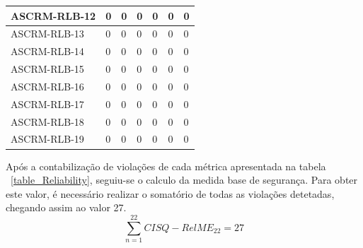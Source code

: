 \documentclass[openany,10pt,a4paper]{article}
\begin{document}
\begin{longtable}{|p{1.9in}|p{0.28in}|p{0.28in}|p{0.28in}|p{0.28in}|p{0.28in}|p{0.35in}|}
ASCRM-RLB-12 & 0 & 0 & 0 & 0 & 0 & 0 \\ \hline
ASCRM-RLB-13 & 0 & 0 & 0 & 0 & 0 & 0 \\ \hline
ASCRM-RLB-14 & 0 & 0 & 0 & 0 & 0 & 0 \\ \hline
ASCRM-RLB-15 & 0 & 0 & 0 & 0 & 0 & 0 \\ \hline
ASCRM-RLB-16 & 0 & 0 & 0 & 0 & 0 & 0 \\ \hline
ASCRM-RLB-17 & 0 & 0 & 0 & 0 & 0 & 0 \\ \hline
ASCRM-RLB-18 & 0 & 0 & 0 & 0 & 0 & 0 \\ \hline
ASCRM-RLB-19 & 0 & 0 & 0 & 0 & 0 & 0 \\ \hline
\end{longtable} 
Após a contabilização de violações de cada métrica apresentada na tabela ~\ref{table_Reliability}, seguiu-se o calculo da medida base de segurança. Para obter este valor, é necessário realizar o somatório de todas as violações detetadas, chegando assim ao valor 27.
$$\sum_{n=1}^{22} CISQ - RelME_{22} = 27$$
\end{document}

